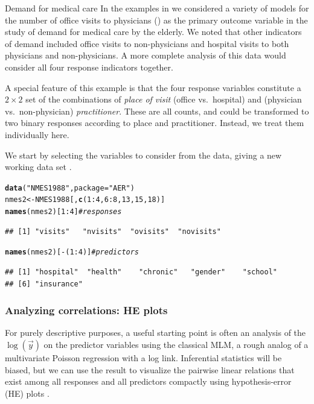 \documentclass[11pt]{book}\usepackage[]{graphicx}\usepackage[]{color}
\makeatletter
\newcommand{\hlnum}[1]{\textcolor[rgb]{0.686,0.059,0.569}{#1}}%
\newcommand{\hlstr}[1]{\textcolor[rgb]{0.192,0.494,0.8}{#1}}%
\newcommand{\hlcom}[1]{\textcolor[rgb]{0.678,0.584,0.686}{\textit{#1}}}%
\newcommand{\hlopt}[1]{\textcolor[rgb]{0,0,0}{#1}}%
\newcommand{\hlstd}[1]{\textcolor[rgb]{0.345,0.345,0.345}{#1}}%
\newcommand{\hlkwb}[1]{\textcolor[rgb]{0.69,0.353,0.396}{#1}}%
\newcommand{\hlkwc}[1]{\textcolor[rgb]{0.333,0.667,0.333}{#1}}%
\newcommand{\hlkwd}[1]{\textcolor[rgb]{0.737,0.353,0.396}{\textbf{#1}}}%
\newenvironment{kframe}{%
 \def\at@end@of@kframe{}%
 \ifinner\ifhmode%
  \def\at@end@of@kframe{\end{minipage}}%
  \begin{minipage}{\columnwidth}%
 \fi\fi%
 \def\FrameCommand##1{\hskip\@totalleftmargin \hskip-\fboxsep
 \colorbox{shadecolor}{##1}\hskip-\fboxsep
     \hskip-\linewidth \hskip-\@totalleftmargin \hskip\columnwidth}%
 \MakeFramed {\advance\hsize-\width
   \@totalleftmargin\z@ \linewidth\hsize
   \@setminipage}}%
 {\par\unskip\endMakeFramed%
 \at@end@of@kframe}
\newenvironment{knitrout}{}{} %
\renewenvironment{knitrout}{\small\renewcommand{\baselinestretch}{.85}}{} %
\makeatother
\begin{document}
\begin{Example}[nmes4]{Demand for medical care}
In the examples in  we considered a variety of models
for the number of office visits to physicians ()
as the primary outcome variable in the study of demand for medical care by the
elderly. We noted that other indicators of demand included office visits to
non-physicians and hospital visits to both physicians and non-physicians.
A more complete analysis of this data would consider all four response
indicators together.

A special feature of this example is that the four response variables constitute
a $2 \times 2$ set of the combinations
of \emph{place of visit} (office vs.\ hospital) and (physician vs.\ non-physician) \emph{practitioner}.
These are all counts, and could be transformed to two binary responses according to
place and practitioner.  Instead, we treat them individually here.

We start by selecting the variables to consider from the  data,
giving a new working data set .

\begin{knitrout}
\color{fgcolor}\begin{kframe}
\begin{alltt}
\hlkwd{data}\hlstd{(}\hlstr{"NMES1988"}\hlstd{,} \hlkwc{package}\hlstd{=}\hlstr{"AER"}\hlstd{)}
\hlstd{nmes2} \hlkwb{<-} \hlstd{NMES1988[,} \hlkwd{c}\hlstd{(}\hlnum{1}\hlopt{:}\hlnum{4}\hlstd{,} \hlnum{6}\hlopt{:}\hlnum{8}\hlstd{,} \hlnum{13}\hlstd{,} \hlnum{15}\hlstd{,} \hlnum{18}\hlstd{)]}
\hlkwd{names}\hlstd{(nmes2)[}\hlnum{1}\hlopt{:}\hlnum{4}\hlstd{]}     \hlcom{# responses}
\end{alltt}
\begin{verbatim}
## [1] "visits"   "nvisits"  "ovisits"  "novisits"
\end{verbatim}
\begin{alltt}
\hlkwd{names}\hlstd{(nmes2)[}\hlopt{-}\hlstd{(}\hlnum{1}\hlopt{:}\hlnum{4}\hlstd{)]}  \hlcom{# predictors}
\end{alltt}
\begin{verbatim}
## [1] "hospital"  "health"    "chronic"   "gender"    "school"   
## [6] "insurance"
\end{verbatim}
\end{kframe}
\end{knitrout}

\subsubsection{Analyzing correlations: HE plots}
For purely descriptive purposes, a useful starting point is often an analysis of the $\log{(\vec{y})}$
on the predictor variables using the classical MLM, a rough analog of a multivariate Poisson regression
with a log link. Inferential statistics will be biased, but we can use the result to visualize the
pairwise linear relations that exist among all responses and all predictors compactly using
hypothesis-error (HE) plots \citep{Friendly:07:manova}.


\end{Example}
\end{document}
